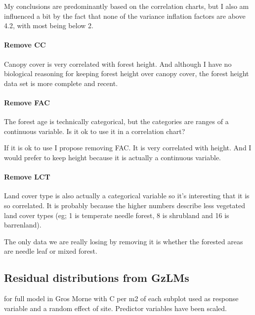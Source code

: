\documentclass[
  letterpaper,
  DIV=11,
  numbers=noendperiod]{scrartcl}
\let\oldparagraph\paragraph
\renewcommand{\paragraph}[1]{\oldparagraph{#1}\mbox{}}
\begin{document}
My conclusions are predominantly based on the correlation charts, but I
also am influenced a bit by the fact that none of the variance inflation
factors are above 4.2, with most being below 2.

\hypertarget{remove-cc}{%
\paragraph{Remove CC}\label{remove-cc}}

Canopy cover is very correlated with forest height. And although I have
no biological reasoning for keeping forest height over canopy cover, the
forest height data set is more complete and recent.

\hypertarget{remove-fac}{%
\paragraph{Remove FAC}\label{remove-fac}}

The forest age is technically categorical, but the categories are ranges
of a continuous variable. Is it ok to use it in a correlation chart?

If it is ok to use I propose removing FAC. It is very correlated with
height. And I would prefer to keep height because it is actually a
continuous variable.

\hypertarget{remove-lct}{%
\paragraph{Remove LCT}\label{remove-lct}}

Land cover type is also actually a categorical variable so it's
interesting that it is so correlated. It is probably because the higher
numbers describe less vegetated land cover types (eg; 1 is temperate
needle forest, 8 is shrubland and 16 is barrenland).

The only data we are really losing by removing it is whether the
forested areas are needle leaf or mixed forest.

\hypertarget{residual-distributions-from-gzlms}{%
\subsection{Residual distributions from
GzLMs}\label{residual-distributions-from-gzlms}}

for full model in Gros Morne with C per m2 of each subplot used as
response variable and a random effect of site. Predictor variables have
been scaled.
\end{document}
